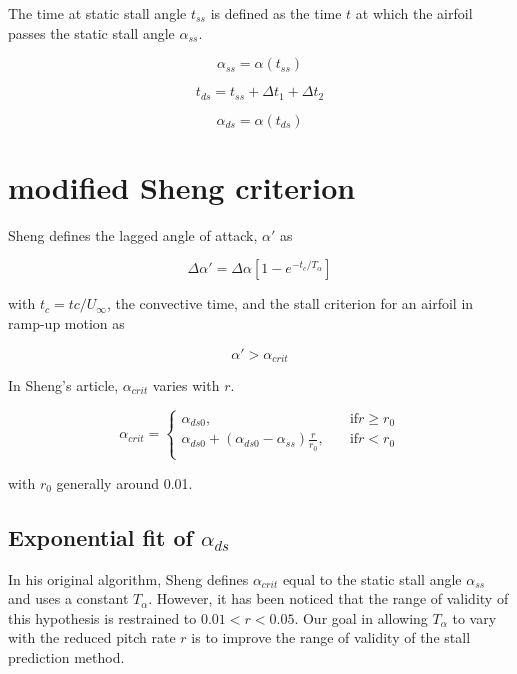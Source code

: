 \documentclass{article}
\begin{document}
The time at static stall angle $t_{ss}$ is defined as the time $t$ at which the airfoil passes the static stall angle $\alpha_{ss}$.

\begin{equation}
\alpha_{ss} = \alpha(t_{ss})
\end{equation}

\begin{equation}
t_{ds} = t_{ss} +  \Delta t_1 + \Delta t_2
\end{equation}

\begin{equation}
\alpha_{ds} = \alpha(t_{ds})
\end{equation}


\section{modified Sheng criterion}

Sheng defines the lagged angle of attack, $\alpha'$ as

\begin{equation}
\Delta \alpha' = \Delta \alpha\left[1-e^{-t_c/T_\alpha} \right]
\label{eq:alpha_lag}
\end{equation}

\noindent with $t_c=tc/U_{\infty}$, the convective time, and the stall criterion for an airfoil in ramp-up motion as 

\begin{equation}
\alpha' > \alpha_{crit}
\label{eq:stall_criterion}
\end{equation}

In Sheng's article, $\alpha_{crit}$ varies with $r$. 

\begin{equation}
\alpha_{crit} =
\begin{cases}
\alpha_{ds0}, &\quad \text{if} r \geq r_0 \\
\alpha_{ds0} + (\alpha_{ds0}-\alpha_{ss}) \frac{r}{r_0}, &\quad \text{if} r < r_0 \\
\end{cases}
\end{equation}

\noindent with $r_0$ generally around 0.01.

\subsection{Exponential fit of $\alpha_{ds}$}

In his original algorithm,  Sheng defines $\alpha_{crit}$ equal to the static stall angle $\alpha_{ss}$ and uses a constant $T_\alpha$. However, it has been noticed that the range of validity of this hypothesis is restrained to $0.01<r<0.05$. Our goal in allowing $T_\alpha$ to vary with the reduced pitch rate $r$ is to improve the range of validity of the stall prediction method. 
\end{document}
